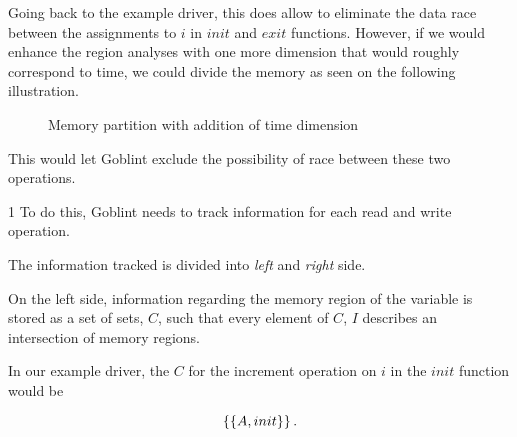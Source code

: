 \documentclass[..thesis.tex]{subfiles}
\newcommand{\opacity}{0.8}
\newcommand{\drawcube}[7]
{
      \filldraw[opacity=\opacity, #7, draw=black, dashed, xzp=#2] (#1,#3) rectangle (#4,#6);
      \filldraw[opacity=\opacity, #7, draw=black, dashed, xzp=#5] (#1,#3) rectangle (#4,#6);
      \filldraw[opacity=\opacity, #7, draw=black, dashed, xyp=#3] (#1,#2) rectangle (#4,#5);
      \filldraw[opacity=\opacity, #7, draw=black, dashed, xyp=#6] (#1,#2) rectangle (#4,#5);
      \filldraw[opacity=\opacity, #7, draw=black, dashed, yzp=#4] (#2,#3) rectangle (#5,#6);
}
\newcommand{\drawcubeoverz}[5]
{
 \drawcube{#1}{#2}{0}{#3}{#4}{\cubez}{#5}
}
\newcommand{\drawoutercube}
{
      \draw[thick,-] (0,0,0) -- ++(\cubex,0,0) -- ++(0,0,\cubez) -- node [anchor = north] {$B$} ++(-0.5*\cubex,0,0) --  node [anchor = north] {$A$} ++(-0.5*\cubex,0,0)  --   ++(0,0,-\cubez);
      \draw[thick,-] (0,\cubey,0) -- ++(\cubex,0,0) -- ++(0,0,\cubez) -- ++(-\cubex,0,0) --   ++(0,0,-\cubez)  ;

      \draw[thick,-] (0,0,0) -- (0,\cubey,0);
      \draw[thick,-] (\cubex,0,0) -- (\cubex,\cubey,0);
      \draw[thick,-] (\cubex,0,\cubez) -- ++(0,\cubey,0);
      \draw[thick,-] (0,0,\cubez) -- (0,\cubey,\cubez);
}
\newcommand{\initColor}{red}
\newcommand{\initLColor}{\initColor!30}
\newcommand{\initRColor}{\initColor!75}
\newcommand{\postInitColor}{blue}
\newcommand{\postInitLColor}{\postInitColor!30}
\newcommand{\postInitRColor}{\postInitColor!75}
\begin{document}
Going back to the example driver, this does allow to eliminate the data race between the assignments to $i$ in $init$ and $exit$ functions. However, if we would enhance the region analyses with one more dimension that would roughly correspond to time, we could divide the memory as seen on the following illustration. 

\begin{figure}[H]
  \centering
    \caption{Memory partition with addition of time dimension}
\end{figure}

This would let Goblint exclude the possibility of race between these two operations. 

1
To do this, Goblint needs to track information for each read and write operation.


The information tracked is divided into \textit{left} and \textit{right} side. 

On the left side, information regarding the memory region of the variable is stored as a set of sets, $C$, such that every element of $C$, $I$ describes an intersection of memory regions.

In our example driver, the $C$ for the increment operation on $i$ in the $init$ function would be 

\begin{equation*}
\left\lbrace \left\lbrace A, init \right\rbrace \right\rbrace \text{.}
\end{equation*} 
\end{document}

